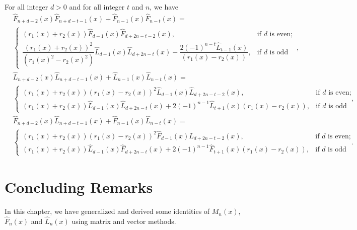   \begin{corollary} For all integer $d > 0$ and for all integer $t$ and $n$, we have
\begin{align*}
&\widehat{F}_{n+d-2}(x)\widehat{F}_{n+d-t-1}(x)+\widehat{F}_{n-1}(x)\widehat{F}_{n-t}(x) =\\ &
 \begin{cases}
 (r_1(x) + r_2(x)) \widehat{F}_{d-1}(x)\widehat{F}_{d+2n-t-2}(x), & \text {if $d$ is even};\\
\dfrac{(r_1(x) + r_2(x))^2}{({r_1(x)}^2 - {r_2(x)}^2)} \widehat{L}_{d-1}(x)\widehat{L}_{d+2n-t}(x)-\dfrac{2(-1)^{n-t}\widehat{L}_{t-1}(x)}{(r_1(x) - r_2(x))}, & \text{if $d$ is odd}
 \end{cases},\\&
\widehat{L}_{n+d-2}(x)\widehat{L}_{n+d-t-1}(x)+\widehat{L}_{n-1}(x)\widehat{L}_{n-t}(x) =\\ &
 \begin{cases}
 (r_1(x) + r_2(x))(r_1(x) - r_2(x))^2\widehat{L}_{d-1}(x)\widehat{L}_{d+2n-t-2}(x), & \text {if $d$ is even};\\
(r_1(x) + r_2(x))\widehat{L}_{d-1}(x)\widehat{L}_{d+2n-t}(x)+2(-1)^{n-1}\widehat{L}_{t+1}(x)(r_1(x) - r_2(x)), & \text{if $d$ is odd}
 \end{cases},\\&
 \widehat{F}_{n+d-2}(x)\widehat{L}_{n+d-t-1}(x)+\widehat{F}_{n-1}(x)\widehat{L}_{n-t}(x) = \\&
 \begin{cases}
 (r_1(x) + r_2(x))(r_1(x) - r_2(x))^2 \widehat{F}_{d-1}(x)\widehat{L}_{d+2n-t-2}(x), & \text {if $d$ is even};\\
(r_1(x) + r_2(x)) \widehat{L}_{d-1}(x)\widehat{F}_{d+2n-t}(x)+2(-1)^{n-1}\widehat{F}_{t+1}(x)(r_1(x) - r_2(x)), & \text{if $d$ is odd}
 \end{cases}.
 \end{align*}
\end{corollary}
\section{Concluding Remarks} In this chapter, we have generalized and derived some identities of $M_{n}(x)$, $\widehat{F}_{n}(x)$ and $\widehat{L}_{n}(x)$ using matrix and vector methods.